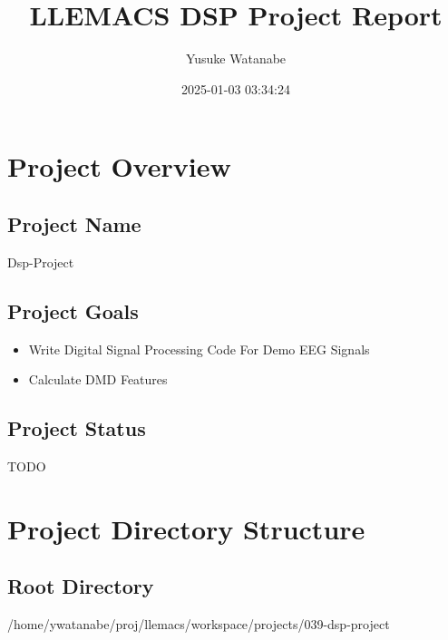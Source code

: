 \documentclass[11pt]{article}
\author{Yusuke Watanabe}
\date{2025-01-03 03:34:24}
\title{LLEMACS DSP Project Report}
\begin{document}
\maketitle
\tableofcontents


\section{Project Overview}
\label{sec:orgbf06494}
\subsection{Project Name}
\label{sec:orga41cbb5}
Dsp-Project

\subsection{Project Goals}
\label{sec:orgecc1e59}
\begin{itemize}
\item Write Digital Signal Processing Code For Demo EEG Signals
\item Calculate DMD Features
\end{itemize}

\subsection{Project Status}
\label{sec:orgd015b1a}
TODO

\section{Project Directory Structure}
\label{sec:orgf99cc87}
\subsection{Root Directory}
\label{sec:org037a9c9}
/home/ywatanabe/proj/llemacs/workspace/projects/039-dsp-project
\end{document}
